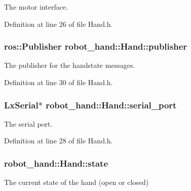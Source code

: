 The motor interface. 



Definition at line 26 of file Hand.\-h.

\subsubsection[{publisher}]{\setlength{\rightskip}{0pt plus 5cm}ros\-::\-Publisher robot\-\_\-hand\-::\-Hand\-::publisher\hspace{0.3cm}{\ttfamily [protected]}}\label{classrobot__hand_1_1Hand_a7ce9350e6149b34389a1c358c9c6782d}


The publisher for the handstate messages. 



Definition at line 30 of file Hand.\-h.

\subsubsection[{serial\-\_\-port}]{\setlength{\rightskip}{0pt plus 5cm}Lx\-Serial$\ast$ robot\-\_\-hand\-::\-Hand\-::serial\-\_\-port\hspace{0.3cm}{\ttfamily [protected]}}\label{classrobot__hand_1_1Hand_a69546b3e21cc9eef9f9821eb81481bc2}


The serial port. 



Definition at line 28 of file Hand.\-h.

\subsubsection[{state}]{ robot\-\_\-hand\-::\-Hand\-::state\hspace{0.3cm}{\ttfamily [protected]}}\label{classrobot__hand_1_1Hand_ae7899d6b009339b4509ae2933a0c3a3b}


The current state of the hand (open or closed) 



